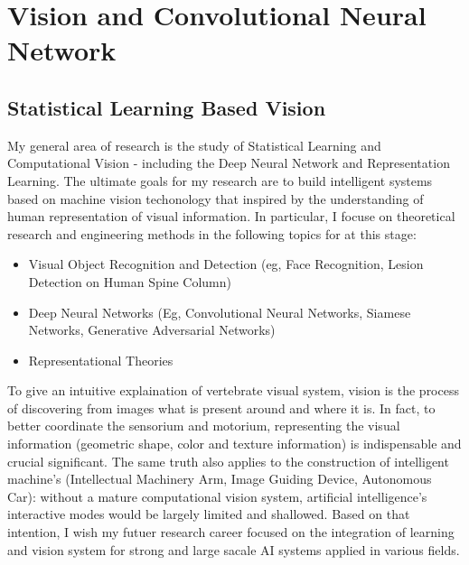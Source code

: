 
\chapter{Vision and Convolutional Neural Network} %

\label{Chapter1} %


\newcommand{\keyword}[1]{\textbf{#1}}
\newcommand{\tabhead}[1]{\textbf{#1}}
\newcommand{\code}[1]{\texttt{#1}}
\newcommand{\file}[1]{\texttt{\bfseries#1}}
\newcommand{\option}[1]{\texttt{\itshape#1}}


\section{Statistical Learning Based Vision}
\large My general area of research is the study of {{Statistical Learning}} and {{Computational Vision}} - including the {{Deep Neural Network}} and {{Representation Learning}}. The ultimate goals for my research are to build intelligent systems based on machine vision techonology
that inspired by the understanding of human representation of visual information. In particular, I focuse on theoretical research and engineering methods in the following topics for at this stage:
 \begin{itemize}
   \item {{Visual Object Recognition and Detection}} {(eg, Face Recognition, Lesion Detection on Human Spine Column)}
   \item {{Deep Neural Networks}} {(Eg, Convolutional Neural Networks, Siamese Networks, Generative Adversarial Networks)}
   \item {{Representational Theories}}
 \end{itemize}

To give an intuitive explaination of vertebrate visual system, vision is the process of discovering from images what is present around and where it is. In fact, to better coordinate the sensorium and motorium, representing the visual information (geometric shape, color and texture information) is indispensable and crucial significant. The same truth also applies to the construction of intelligent machine's 
{(Intellectual Machinery Arm, Image Guiding Device, Autonomous Car)}: without a mature computational vision system, artificial intelligence's interactive modes would be largely limited and shallowed. Based on that intention, I wish my futuer research career focused on the integration of learning and vision system for strong and large sacale AI systems applied in various fields.

